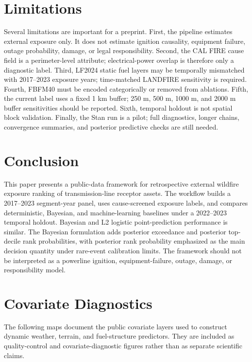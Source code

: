 \documentclass[11pt]{article}
\begin{document}
\section{Limitations}

Several limitations are important for a preprint. First, the pipeline estimates
external exposure only. It does not estimate ignition causality, equipment
failure, outage probability, damage, or legal responsibility. Second, the CAL
FIRE cause field is a perimeter-level attribute; electrical-power overlap is
therefore only a diagnostic label. Third, LF2024 static fuel layers may be
temporally mismatched with 2017--2023 exposure years; time-matched LANDFIRE
sensitivity is required. Fourth, FBFM40 must be encoded categorically or
removed from ablations. Fifth, the current label uses a fixed 1 km buffer;
250 m, 500 m, 1000 m, and 2000 m buffer sensitivities should be reported.
Sixth, temporal holdout is not spatial block validation. Finally, the Stan run
is a pilot; full diagnostics, longer chains, convergence summaries, and
posterior predictive checks are still needed.

\section{Conclusion}

This paper presents a public-data framework for retrospective external wildfire
exposure ranking of transmission-line receptor assets. The workflow builds a
2017--2023 segment-year panel, uses cause-screened exposure labels, and compares
deterministic, Bayesian, and machine-learning baselines under a 2022--2023
temporal holdout. Bayesian and L2 logistic point-prediction performance is
similar. The Bayesian formulation adds posterior exceedance and posterior
top-decile rank probabilities, with posterior rank probability emphasized as
the main decision quantity under rare-event calibration limits. The framework
should not be interpreted as a powerline ignition, equipment-failure, outage,
damage, or responsibility model.

\appendix

\section{Covariate Diagnostics}

The following maps document the public covariate layers used to construct
dynamic weather, terrain, and fuel-structure predictors. They are included as
quality-control and covariate-diagnostic figures rather than as separate
scientific claims.
\end{document}
